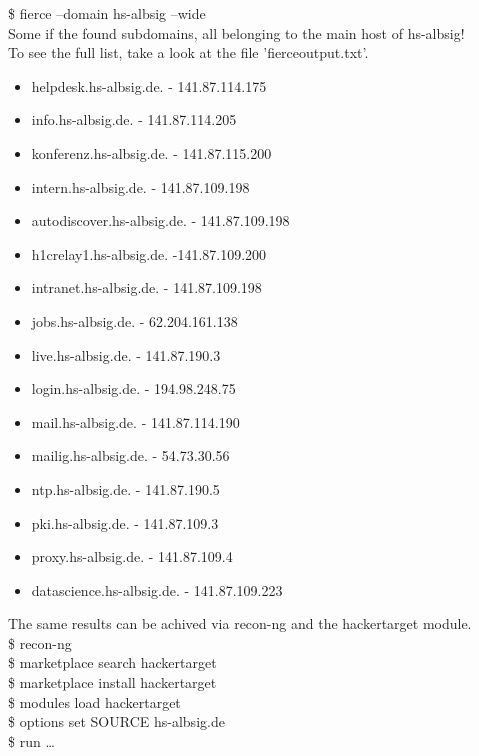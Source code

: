 \documentclass[a4paper,10pt]{article}
\begin{document}
\noindent\$\raisebox{-0.9ex}{\~{}} fierce --domain hs-albsig --wide\\
Some if the found subdomains, all belonging to the main host of hs-albsig!\\
To see the full list, take a look at the file 'fierceoutput.txt'.  
\\
\begin{itemize}
 \item helpdesk.hs-albsig.de. - 141.87.114.175
 \item info.hs-albsig.de. - 141.87.114.205
 \item konferenz.hs-albsig.de. - 141.87.115.200
 \item intern.hs-albsig.de. - 141.87.109.198
 \item autodiscover.hs-albsig.de. - 141.87.109.198
 \item h1crelay1.hs-albsig.de. -141.87.109.200
 \item intranet.hs-albsig.de. - 141.87.109.198
 \item jobs.hs-albsig.de. - 62.204.161.138
 \item live.hs-albsig.de. - 141.87.190.3
 \item login.hs-albsig.de. - 194.98.248.75
 \item mail.hs-albsig.de. - 141.87.114.190
 \item mailig.hs-albsig.de. - 54.73.30.56
 \item ntp.hs-albsig.de. - 141.87.190.5
 \item pki.hs-albsig.de. - 141.87.109.3
 \item proxy.hs-albsig.de. - 141.87.109.4
 \item datascience.hs-albsig.de. - 141.87.109.223
  

\end{itemize}

\vspace{10mm}
\noindent The same results can be achived via recon-ng and the hackertarget module.\\
\newline
\noindent\$\raisebox{-0.9ex}{\~{}} recon-ng\\
\$\raisebox{-0.9ex}{\~{}} marketplace search hackertarget\\
\$\raisebox{-0.9ex}{\~{}} marketplace install hackertarget\\
\$\raisebox{-0.9ex}{\~{}} modules load hackertarget\\ 
\$\raisebox{-0.9ex}{\~{}} options set SOURCE hs-albsig.de\\
\$\raisebox{-0.9ex}{\~{}} run \dots
\end{document}
